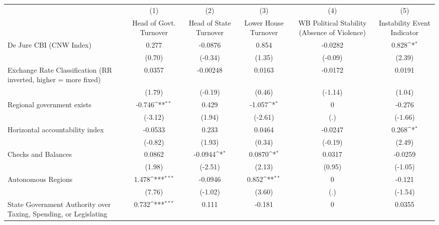 {
\def\sym#1{\ifmmode^{#1}\else\(^{#1}\)\fi}
\begin{tabular}{l*{5}{c}}
\hline\hline
                &\multicolumn{1}{c}{(1)}&\multicolumn{1}{c}{(2)}&\multicolumn{1}{c}{(3)}&\multicolumn{1}{c}{(4)}&\multicolumn{1}{c}{(5)}\\
                &\multicolumn{1}{c}{Head of Govt. Turnover}&\multicolumn{1}{c}{Head of State Turnover}&\multicolumn{1}{c}{Lower House Turnover}&\multicolumn{1}{c}{WB Political Stability (Absence of Violence)}&\multicolumn{1}{c}{Instability Event Indicator}\\
\hline
De Jure CBI (CNW Index)&    0.277         &  -0.0876         &    0.854         &  -0.0282         &    0.828\sym{*}  \\
                &   (0.70)         &  (-0.34)         &   (1.35)         &  (-0.09)         &   (2.39)         \\
[1em]
Exchange Rate Classification (RR inverted, higher = more fixed)&   0.0357         & -0.00248         &   0.0163         &  -0.0172         &   0.0191         \\
                &   (1.79)         &  (-0.19)         &   (0.46)         &  (-1.14)         &   (1.04)         \\
[1em]
Regional government exists   &   -0.746\sym{**} &    0.429         &   -1.057\sym{*}  &        0         &   -0.276         \\
                &  (-3.12)         &   (1.94)         &  (-2.61)         &      (.)         &  (-1.66)         \\
[1em]
Horizontal accountability index&  -0.0533         &    0.233         &   0.0464         &  -0.0247         &    0.268\sym{*}  \\
                &  (-0.82)         &   (1.93)         &   (0.34)         &  (-0.19)         &   (2.49)         \\
[1em]
Checks and Balances&   0.0862         &  -0.0944\sym{*}  &   0.0870\sym{*}  &   0.0317         &  -0.0259         \\
                &   (1.98)         &  (-2.51)         &   (2.13)         &   (0.95)         &  (-1.05)         \\
[1em]
Autonomous Regions&    1.478\sym{***}&  -0.0946         &    0.852\sym{**} &        0         &   -0.121         \\
                &   (7.76)         &  (-1.02)         &   (3.60)         &      (.)         &  (-1.54)         \\
[1em]
State Government Authority over Taxing, Spending, or Legislating&    0.732\sym{***}&    0.111         &   -0.181         &        0         &   0.0355         \\

\end{tabular}}
